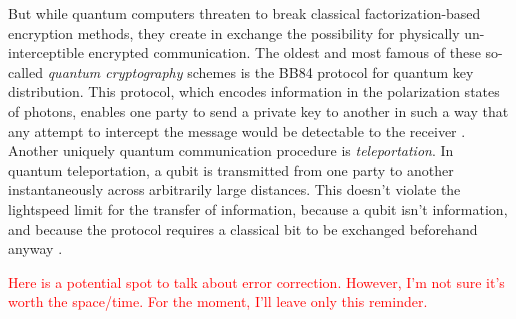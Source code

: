 \documentclass[12pt]{puthesis}
\newcommand{\notetoself}[1]{\textcolor{red}{#1}}
\begin{document}
But while quantum computers threaten to break classical factorization-based encryption methods, they create in exchange the possibility for physically un-interceptible encrypted communication. The oldest and most famous of these so-called \emph{quantum cryptography} schemes is the BB84 protocol for quantum key distribution. This protocol, which encodes information in the polarization states of photons, enables one party to send a private key to another in such a way that any attempt to intercept the message would be detectable to the receiver \cite{Bennett2014,Shor2000}. Another uniquely quantum communication procedure is \emph{teleportation}. In quantum teleportation, a qubit is transmitted from one party to another instantaneously across arbitrarily large distances. This doesn't violate the lightspeed limit for the transfer of information, because a qubit isn't information, and because the protocol requires a classical bit to be exchanged beforehand anyway \cite{Bennett1993}. 

\notetoself{Here is a potential spot to talk about error correction. However, I'm not sure it's worth the space/time. For the moment, I'll leave only this reminder.}
\end{document}
